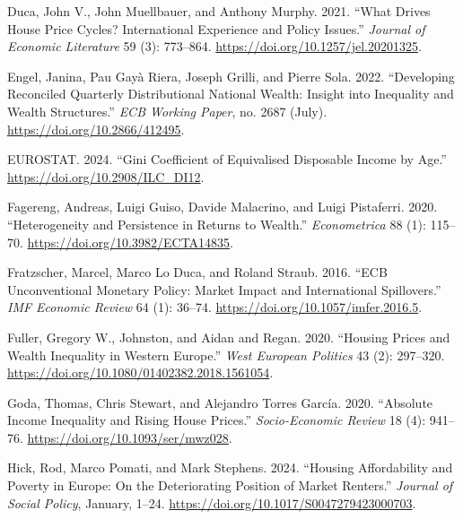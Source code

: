 \documentclass[
  a4paper,
  DIV=11,
  numbers=noendperiod]{scrartcl}
\newlength{\cslhangindent}
\newenvironment{CSLReferences}[2] %
 {\begin{list}{}{%
  \setlength{\itemindent}{0pt}
  \setlength{\leftmargin}{0pt}
  \setlength{\parsep}{0pt}
  \ifodd #1
   \setlength{\leftmargin}{\cslhangindent}
   \setlength{\itemindent}{-1\cslhangindent}
  \fi
  \setlength{\itemsep}{#2\baselineskip}}}
 {\end{list}}
\begin{document}
\begin{CSLReferences}{1}{0}
Duca, John V., John Muellbauer, and Anthony Murphy. 2021. {``What
{Drives House Price Cycles}? {International Experience} and {Policy
Issues}.''} \emph{Journal of Economic Literature} 59 (3): 773--864.
\url{https://doi.org/10.1257/jel.20201325}.

Engel, Janina, Pau Gayà Riera, Joseph Grilli, and Pierre Sola. 2022.
{``Developing Reconciled Quarterly Distributional National Wealth:
{Insight} into Inequality and Wealth Structures.''} \emph{ECB Working
Paper}, no. 2687 (July). \url{https://doi.org/10.2866/412495}.

EUROSTAT. 2024. {``Gini Coefficient of Equivalised Disposable Income by
Age.''} \url{https://doi.org/10.2908/ILC_DI12}.

Fagereng, Andreas, Luigi Guiso, Davide Malacrino, and Luigi Pistaferri.
2020. {``Heterogeneity and {Persistence} in {Returns} to {Wealth}.''}
\emph{Econometrica} 88 (1): 115--70.
\url{https://doi.org/10.3982/ECTA14835}.

Fratzscher, Marcel, Marco Lo Duca, and Roland Straub. 2016. {``{ECB
Unconventional Monetary Policy}: {Market Impact} and {International
Spillovers}.''} \emph{IMF Economic Review} 64 (1): 36--74.
\url{https://doi.org/10.1057/imfer.2016.5}.

Fuller, Gregory W., Johnston, and Aidan and Regan. 2020. {``Housing
Prices and Wealth Inequality in {Western Europe}.''} \emph{West European
Politics} 43 (2): 297--320.
\url{https://doi.org/10.1080/01402382.2018.1561054}.

Goda, Thomas, Chris Stewart, and Alejandro Torres García. 2020.
{``Absolute Income Inequality and Rising House Prices.''}
\emph{Socio-Economic Review} 18 (4): 941--76.
\url{https://doi.org/10.1093/ser/mwz028}.

Hick, Rod, Marco Pomati, and Mark Stephens. 2024. {``Housing
Affordability and Poverty in {Europe}: On the Deteriorating Position of
Market Renters.''} \emph{Journal of Social Policy}, January, 1--24.
\url{https://doi.org/10.1017/S0047279423000703}.


\end{CSLReferences}
\end{document}

